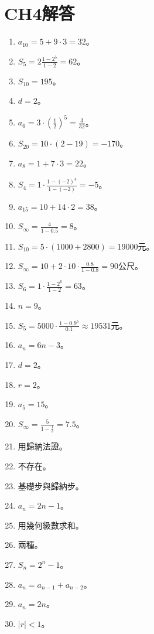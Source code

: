 \section{CH4解答}
\begin{enumerate}[label=\arabic*.]
    \item $a_{10} = 5 + 9 \cdot 3 = 32$。
    \item $S_5 = 2 \frac{1 - 2^5}{1 - 2} = 62$。
    \item $S_{10} = 195$。
    \item $d = 2$。
    \item $a_6 = 3 \cdot \left(\frac{1}{2}\right)^5 = \frac{3}{32}$。
    \item $S_{20} = 10 \cdot (2 - 19) = -170$。
    \item $a_8 = 1 + 7 \cdot 3 = 22$。
    \item $S_4 = 1 \cdot \frac{1 - (-2)^4}{1 - (-2)} = -5$。
    \item $a_{15} = 10 + 14 \cdot 2 = 38$。
    \item $S_\infty = \frac{4}{1 - 0.5} = 8$。
    \item $S_{10} = 5 \cdot (1000 + 2800) = 19000$元。
    \item $S_\infty = 10 + 2 \cdot 10 \cdot \frac{0.8}{1 - 0.8} = 90$公尺。
    \item $S_6 = 1 \cdot \frac{1 - 2^6}{1 - 2} = 63$。
    \item $n = 9$。
    \item $S_5 = 5000 \cdot \frac{1 - 0.9^5}{0.1} \approx 19531$元。
    \item $a_n = 6n - 3$。
    \item $d = 2$。
    \item $r = 2$。
    \item $a_5 = 15$。
    \item $S_\infty = \frac{5}{1 - \frac{1}{3}} = 7.5$。
    \item 用歸納法證。
    \item 不存在。
    \item 基礎步與歸納步。
    \item $a_n = 2n - 1$。
    \item 用幾何級數求和。
    \item 兩種。
    \item $S_n = 2^n - 1$。
    \item $a_n = a_{n-1} + a_{n-2}$。
    \item $a_n = 2n$。
    \item $|r| < 1$。

\end{enumerate}
